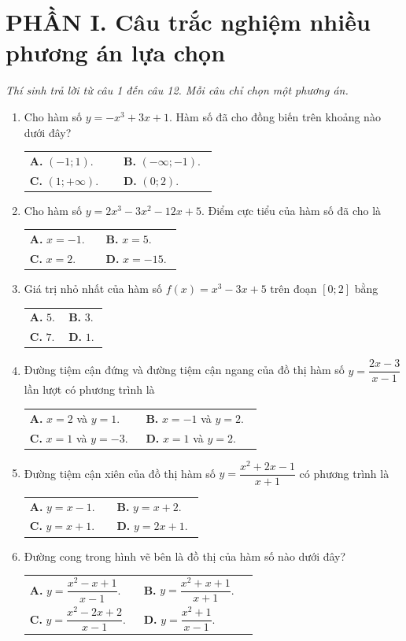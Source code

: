 \documentclass[12pt,a4paper]{article}
\makeatletter
\newcommand{\bonpa}[4]{\par\nobreak\smallskip\nobreak\noindent
\begin{tabular}{@{}p{0.47\linewidth}p{0.47\linewidth}@{}}
\textbf{A.} #1 & \textbf{B.} #2\\[8pt]
\textbf{C.} #3 & \textbf{D.} #4\end{tabular}}
\makeatother
\begin{document}
\section*{\large PHẦN I. Câu trắc nghiệm nhiều phương án lựa chọn}
\textit{Thí sinh trả lời từ câu 1 đến câu 12. Mỗi câu chỉ chọn một phương án.}
\begin{enumerate}
\item Cho hàm số $y=-x^3+3x+1$. Hàm số đã cho đồng biến trên khoảng nào dưới đây?
\bonpa{$(-1;1)$.}{$(-\infty;-1)$.}{$(1;+\infty)$.}{$(0;2)$.}

\item Cho hàm số $y=2x^3-3x^2-12x+5$. Điểm cực tiểu của hàm số đã cho là
\bonpa{$x=-1$.}{$x=5$.}{$x=2$.}{$x=-15$.}

\item Giá trị nhỏ nhất của hàm số $f(x)=x^3-3x+5$ trên đoạn $[0;2]$ bằng
\bonpa{$5$.}{$3$.}{$7$.}{$1$.}

\item Đường tiệm cận đứng và đường tiệm cận ngang của đồ thị hàm số $y=\dfrac{2x-3}{x-1}$ lần lượt có phương trình là
\bonpa{$x=2$ và $y=1$.}{$x=-1$ và $y=2$.}{$x=1$ và $y=-3$.}{$x=1$ và $y=2$.}

\item Đường tiệm cận xiên của đồ thị hàm số $y=\dfrac{x^2+2x-1}{x+1}$ có phương trình là
\bonpa{$y=x-1$.}{$y=x+2$.}{$y=x+1$.}{$y=2x+1$.}

\item Đường cong trong hình vẽ bên là đồ thị của hàm số nào dưới đây?
\par\nobreak\smallskip
\begin{minipage}[c]{0.62\linewidth}
\bonpa{$y=\dfrac{x^2-x+1}{x-1}$.}{$y=\dfrac{x^2+x+1}{x+1}$.}{$y=\dfrac{x^2-2x+2}{x-1}$.}{$y=\dfrac{x^2+1}{x-1}$.}
\end{minipage}\hfill
\begin{minipage}[c]{0.36\linewidth}\centering
{}
\end{minipage}
\end{enumerate}
\end{document}
